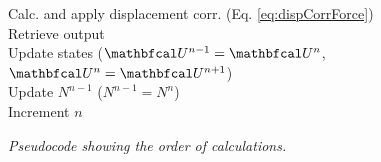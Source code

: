 \begin{algorithm}[ht]
{{{\begin{minipage}[c]{0.9\linewidth}
                Calc. and apply displacement corr. (Eq. \eqref{eq:dispCorrForce})\\
                Retrieve output\\
                Update states ($\U^{n-1} = \U^n$, $\U^n = \U^{n+1}$)\\
                Update $N^{n-1}$ ($N^{n-1} = N^n$)\\
                Increment $n$
            \end{minipage} 
            

            }
        }
    }
    \vspace{0.12cm}
    \caption{\it Pseudocode showing the order of calculations.\label{alg:calcOrder}}
\end{algorithm}